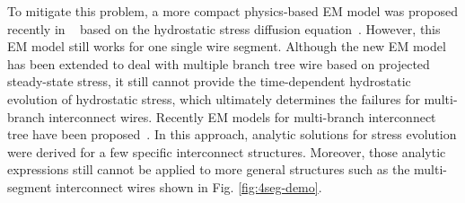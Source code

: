 To mitigate this problem, a more compact physics-based EM model was
proposed recently in ~\cite{HuangYu:DAC'14} based on the hydrostatic
stress diffusion equation~\cite{Korhonen:jap1993}. However, this EM
model still works for one single wire segment. Although the new EM
model has been extended to deal with multiple branch tree wire based
on projected steady-state stress, it still cannot provide the
time-dependent hydrostatic evolution of hydrostatic stress, which
ultimately determines the failures for multi-branch interconnect
wires. Recently EM models for multi-branch interconnect tree have
been proposed~\cite{ChenHuang:DAC'15,ChenTan:TCAD'16}. In this
approach, analytic solutions for stress evolution were derived for a
few specific interconnect structures. Moreover, those analytic
expressions still cannot be applied to more general structures
such as the multi-segment interconnect wires shown in
Fig. \ref{fig:4seg-demo}.




